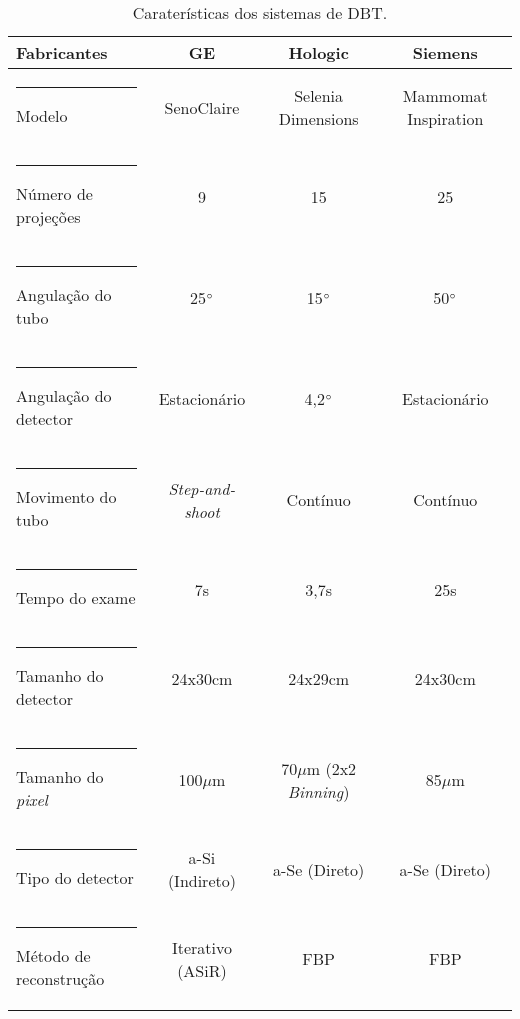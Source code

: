 \begin{table}[h]
	\centering
	\caption{Caraterísticas dos sistemas  de \acs{DBT}.}
	\label{tab:tabCap2SistemasDBT}
	\footnotesize
	\begin{tabular}{l|c|c|c}
		\textbf{Fabricantes}                                       &        \textbf{\acs{GE}}        &                 \textbf{Hologic}                 &   \textbf{Siemens}   \\
		[5pt]
		\hline
		\hline
		\rule[-0.5ex]{-3pt}{3ex}
		Modelo &    SenoClaire{\footnotesize\texttrademark}    & Selenia\textsuperscript{\textregistered} Dimensions\textsuperscript{\textregistered} & Mammomat Inspiration \\ \hline
		\rule[-0.5ex]{-3pt}{3ex}
		Número de projeções              &                9                &                        15                        &          25          \\ \hline
		\rule[-0.5ex]{-3pt}{3ex}
		Angulação do tubo                &           25$\degree$           &                   15$\degree$                    &     50$\degree$      \\ \hline
		\rule[-0.5ex]{-3pt}{3ex}
		Angulação do detector            &          Estacionário           &                   4,2$\degree$                   &     Estacionário     \\ \hline
		\rule[-0.5ex]{-3pt}{3ex}
		Movimento do tubo                &     \textit{Step-and-shoot}     &                     Contínuo                     &       Contínuo       \\ \hline
		\rule[-0.5ex]{-3pt}{3ex}
		Tempo do exame                   &               7s                &                       3,7s                       &         25s          \\ \hline
		\rule[-0.5ex]{-3pt}{3ex}
		Tamanho do detector              &             24x30cm             &                     24x29cm                      &       24x30cm        \\ \hline
		\rule[-0.5ex]{-3pt}{3ex}
		Tamanho do \textit{pixel}        &            100$\mu$m            &         70$\mu$m (2x2 \textit{Binning})          &       85$\mu$m       \\ \hline
		\rule[-0.5ex]{-3pt}{3ex}
		Tipo do detector                 &         \acs{a-Si} (Indireto)         &                  \acs{a-Se} (Direto)                   &    \acs{a-Se} (Direto)     \\ \hline
		\rule[-0.5ex]{-3pt}{3ex}
		Método de reconstrução           & Iterativo (ASiR\textsuperscript{\textregistered}) &                    \acs{FBP}                     &      \acs{FBP}       \\ \hline
	\end{tabular}
	\vspace{2ex}
\end{table}


 
    

